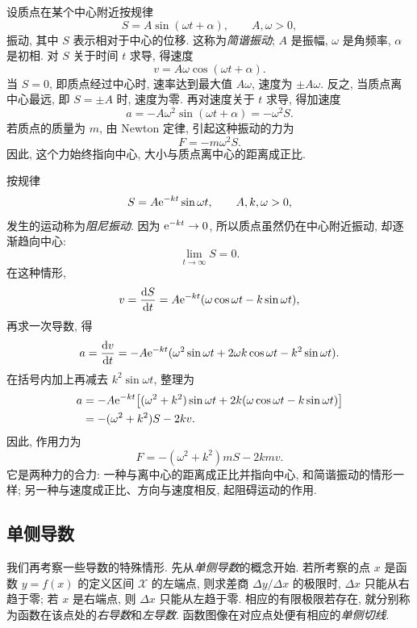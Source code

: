 \label{ex:simple_harmonic_motion}
设质点在某个中心附近按规律
$$
S=A\sin(\omega t+\alpha),\qquad A,\omega>0,
$$
振动, 其中 $S$ 表示相对于中心的位移.
这称为\emph{简谐振动};
$A$ 是振幅, $\omega$ 是角频率,
$\alpha$ 是初相.
对 $S$ 关于时间 $t$ 求导, 得速度
$$
v=A\omega\cos(\omega t+\alpha).
$$
当 $S=0$, 即质点经过中心时, 速率达到最大值 $A\omega$, 速度为 $\pm A\omega$.
反之, 当质点离中心最远, 即 $S=\pm A$ 时, 速度为零.
再对速度关于 $t$ 求导, 得加速度
$$
a=-A\omega^2\sin(\omega t+\alpha)=-\omega^2S.
$$
若质点的质量为 $m$, 由 Newton 定律, 引起这种振动的力为
$$
F=-m\omega^2S.
$$
因此, 这个力始终指向中心, 大小与质点离中心的距离成正比.

\label{ex:damped_harmonic_motion}
按规律
$$
S=A\mathrm{e}^{-kt}\sin\omega t,\qquad A,k,\omega>0,
$$
发生的运动称为\emph{阻尼振动}.
因为 $\mathrm{e}^{-kt}\to0$, 所以质点虽然仍在中心附近振动, 却逐渐趋向中心:
$$
\lim_{t\to\infty}S=0.
$$
在这种情形,
$$
v=\frac{\mathrm{d} S}{\mathrm{d} t}=A\mathrm{e}^{-kt}(\omega\cos\omega t-k\sin\omega t),
$$
再求一次导数, 得
$$
a=\frac{\mathrm{d} v}{\mathrm{d} t}
=-A\mathrm{e}^{-kt}(\omega^2\sin\omega t+2\omega k\cos\omega t-k^2\sin\omega t).
$$
在括号内加上再减去 $k^2\sin\omega t$, 整理为
\begin{align*}
a&=-A\mathrm{e}^{-kt}\bigl[(\omega^2+k^2)\sin\omega t
 +2k(\omega\cos\omega t-k\sin\omega t)\bigr]\\
&=-(\omega^2+k^2)S-2kv.
\end{align*}
因此, 作用力为
$$
F=-(\omega^2+k^2)mS-2kmv.
$$
它是两种力的合力: 一种与离中心的距离成正比并指向中心, 和简谐振动的情形一样;
另一种与速度成正比、方向与速度相反, 起阻碍运动的作用.

\subsection{单侧导数}\label{subsec:100}
\begingroup
\setlength{\abovedisplayskip}{9pt plus 2pt minus 1pt}
\setlength{\belowdisplayskip}{9pt plus 2pt minus 1pt}
\setlength{\abovedisplayshortskip}{4pt plus 1pt}
\setlength{\belowdisplayshortskip}{9pt plus 2pt minus 1pt}
我们再考察一些导数的特殊情形.
先从\emph{单侧导数}的概念开始.
若所考察的点 $x$ 是函数 $y=f(x)$ 的定义区间 $\mathcal{X}$ 的左端点,
则求差商 $\Delta y/\Delta x$ 的极限时, $\Delta x$ 只能从右趋于零;
若 $x$ 是右端点, 则 $\Delta x$ 只能从左趋于零.
{\kaishu 相应的有限极限若存在, 就分别称为函数在该点处的\emph{右导数}和\emph{左导数}.}
函数图像在对应点处便有相应的\emph{单侧切线}.

